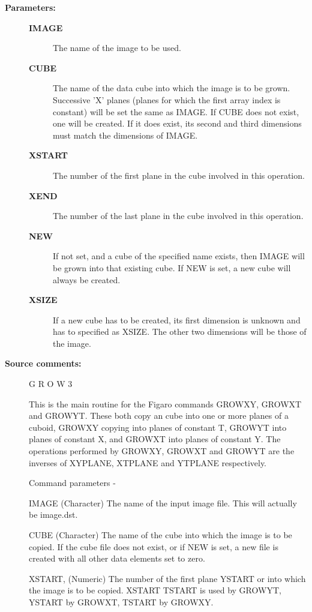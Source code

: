 \begin{description}
\begin{description}
\item [\textbf{Parameters:}]
\begin{description}
\item [\textbf{IMAGE}]
 The name of the image to be used.
\item [\textbf{CUBE}]
 The name of the data cube into which the image
 is to be grown.  Successive 'X' planes (planes for which
 the first array index is constant) will be set the same
 as IMAGE.  If CUBE does not exist, one will be created.
 If it does exist, its second and third dimensions must
 match the dimensions of IMAGE.
\item [\textbf{XSTART}]
 The number of the first plane in the cube
 involved in this operation.
\item [\textbf{XEND}]
 The number of the last plane in the cube
 involved in this operation.
\item [\textbf{NEW}]
 If not set, and a cube of the specified name exists,
 then IMAGE will be grown into that existing cube.
 If NEW is set, a new cube will always be created.
\item [\textbf{XSIZE}]
 If a new cube has to be created, its first dimension
 is unknown and has to specified as XSIZE.  The other
 two dimensions will be those of the image.
\end{description}

\item [\textbf{Source comments:}]
\begin{terminalv}
 G R O W 3

 This is the main routine for the Figaro commands GROWXY, GROWXT
 and GROWYT.  These both copy an cube into one or more
 planes of a cuboid, GROWXY copying into planes of constant T,
 GROWYT into planes of constant X, and GROWXT into planes of
 constant Y.  The operations performed by GROWXY, GROWXT and
 GROWYT are the inverses of XYPLANE, XTPLANE and YTPLANE
 respectively.

 Command parameters -

 IMAGE       (Character) The name of the input image file.
             This will actually be image.dst.

 CUBE        (Character) The name of the cube into which the
             image is to be copied.  If the cube file does
             not exist, or if NEW is set, a new file is created
             with all other data elements set to zero.

 XSTART,     (Numeric) The number of the first plane
 YSTART or   into which the image is to be copied.  XSTART
 TSTART      is used by GROWYT, YSTART by GROWXT, TSTART by GROWXY.


\end{terminalv}
\end{description}
\end{description}
